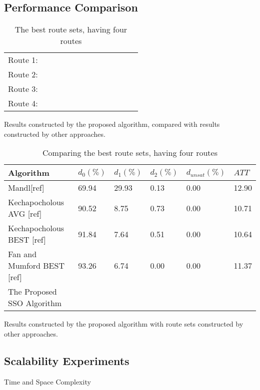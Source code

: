 \subsection{Performance Comparison}

\begin{table}[H]
	\centering
    \begin{tabular}{|l|l l l l l l l l|}
    \hline
    Route 1: & ~ & ~ & ~ & ~ & ~ & ~ & ~ & ~ \\
    Route 2: & ~ & ~ & ~ & ~ & ~ & ~ & ~ & ~ \\
    Route 3: & ~ & ~ & ~ & ~ & ~ & ~ & ~ & ~ \\
    Route 4: & ~ & ~ & ~ & ~ & ~ & ~ & ~ & ~ \\
	\hline
    \end{tabular}
    \caption {The best route sets, having four routes}
    Results constructed by the proposed algorithm, compared with results constructed by other approaches.
    \label{table:performanceComparison_bestRouteSet4}
	\end{table}

\begin{table}[H]
	\centering
    \begin{tabular}{|l||l|l|l|l|l|}
 	\hline
 	Algorithm & $d_0(\%)$ & $d_1(\%)$ & $d_2(\%)$ & $d_{unsat}(\%)$ & $ATT$ \\
 	\hline
    Mandl[ref] & 69.94 & 29.93 & 0.13 & 0.00 & 12.90 \\
    Kechapocholous AVG [ref] & 90.52 & 8.75 & 0.73 & 0.00 & 10.71 \\
    Kechapocholous BEST [ref] & 91.84 & 7.64 & 0.51 & 0.00 & 10.64 \\
    Fan and Mumford BEST [ref] & 93.26 & 6.74 & 0.00 & 0.00 & 11.37 \\
	\hline
    \hline
    The Proposed SSO Algorithm & ~ & ~ & ~ & ~ & ~ \\
    \hline
    \end{tabular}
    \caption {Comparing the best route sets, having four routes}
    Results constructed by the proposed algorithm with route sets constructed by other approaches.
    \label{table:performanceComparison_4}
	\end{table}

\subsection{Scalability Experiments}
Time and Space Complexity